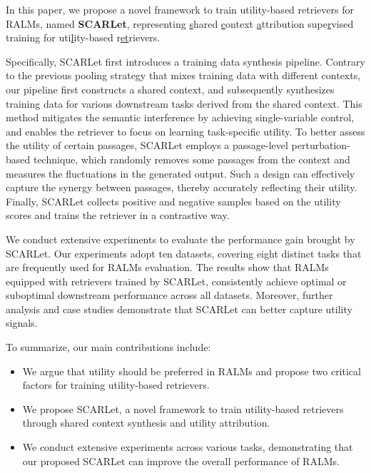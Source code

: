 \documentclass[11pt]{article}
\begin{document}
In this paper, we propose a novel framework to train utility-based retrievers for RALMs, named \textbf{SCARLet}, representing \underline{s}hared \underline{c}ontext \underline{a}ttribution supe\underline{r}vised training for uti\underline{l}ity-based r\underline{et}rievers.



Specifically, SCARLet first introduces a training data synthesis pipeline. Contrary to the previous pooling strategy that mixes training data with different contexts, our pipeline first constructs a shared context, and subsequently synthesizes training data for various downstream tasks derived from the shared context. This method mitigates the semantic interference by achieving single-variable control, and enables the retriever to focus on learning task-specific utility. To better assess the utility of certain passages, SCARLet employs a passage-level perturbation-based technique, which randomly removes some passages from the context and measures the fluctuations in the generated output. Such a design can effectively capture the synergy between passages, thereby accurately reflecting their utility. Finally, SCARLet collects positive and negative samples based on the utility scores and trains the retriever in a contrastive way.



We conduct extensive experiments to evaluate the performance gain brought by SCARLet. Our experiments adopt ten datasets, covering eight distinct tasks that are frequently used for RALMs evaluation. The results show that RALMs equipped with retrievers trained by SCARLet, consistently achieve optimal or suboptimal downstream performance across all datasets. Moreover, further analysis and case studies demonstrate that SCARLet can better capture utility signals.


To summarize, our main contributions include:

\begin{itemize}
    \item We argue that utility should be preferred in RALMs and propose two critical factors for training utility-based retrievers.
    \item We propose SCARLet, a novel framework to train utility-based retrievers through shared context synthesis and utility attribution.
    \item We conduct extensive experiments across various tasks, demonstrating that our proposed SCARLet can improve the overall performance of RALMs.
\end{itemize}
\end{document}

